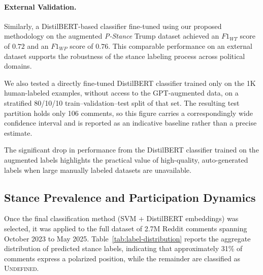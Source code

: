 \documentclass[letterpaper]{article} %
\begin{document}
\paragraph{External Validation.}
Similarly, a DistilBERT-based classifier fine-tuned using our proposed methodology on the augmented \textit{P-Stance} Trump dataset \cite{p_stance_data} achieved an $F1_{WT}$ score of $0.72$ and an $F1_{WP}$ score of $0.76$. This comparable performance on an external dataset supports the robustness of the stance labeling process across political domains.

We also tested a directly fine-tuned DistilBERT classifier trained only on the 1K human-labeled examples, without access to the GPT-augmented data, on a stratified 80/10/10 train--validation--test split of that set. The resulting test partition holds only 106 comments, so this figure carries a correspondingly wide confidence interval and is reported as an indicative baseline rather than a precise estimate. 

\begin{table}[h!]
\centering
\caption{Fine-Tuned Classifier performance on held-out test set.}
\label{tab:ft-comparison-results}
\end{table}

The significant drop in performance from the DistilBERT classifier trained on the augmented labels highlights the practical value of high-quality, auto-generated labels when large manually labeled datasets are unavailable.

\subsection{Stance Prevalence and Participation Dynamics}

Once the final classification method (SVM + DistilBERT embeddings) was selected, it was applied to the full dataset of 2.7M Reddit comments spanning October 2023 to May 2025. Table~\ref{tab:label-distribution} reports the aggregate distribution of predicted stance labels, indicating that approximately 31\% of comments express a polarized position, while the remainder are classified as \textsc{Undefined}.
\end{document}
